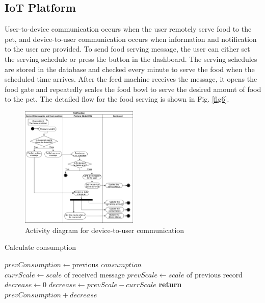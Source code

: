 \documentclass[conference]{IEEEtran}
\begin{document}
\subsection{IoT Platform}
User-to-device communication occurs when the user remotely serve food to the pet, and device-to-user communication occurs when information and notification to the user are provided.
To send food serving message, the user can either set the serving schedule or press the button in the dashboard.
The serving schedules are stored in the database and checked every minute to serve the food when the scheduled time arrives.
After the feed machine receives the message, it opens the food gate and repeatedly scales the food bowl to serve the desired amount of food to the pet.
The detailed flow for the food serving is shown in Fig. \ref{fig6}.

\begin{figure}[htbp]
\centerline{\includegraphics[width=0.5\textwidth]{./images/device2user.png}}
\caption{Activity diagram for device-to-user communication}
\label{fig7}
\end{figure}

\begin{algorithm}
\caption{Calculate consumption}\label{algo1}
\begin{algorithmic}
        \State $prevConsumption \gets \text{previous } \textit{consumption}$
        \State $currScale \gets \textit{scale} \text{ of received message}$
        \State $prevScale \gets \textit{scale} \text{ of  previous record}$
        \State $decrease \gets 0$
            \State $decrease \gets prevScale - currScale$
        \EndIf
        \State \textbf{return} $prevConsumption + decrease$
    \EndProcedure
\end{algorithmic}
\end{algorithm}
\end{document}
